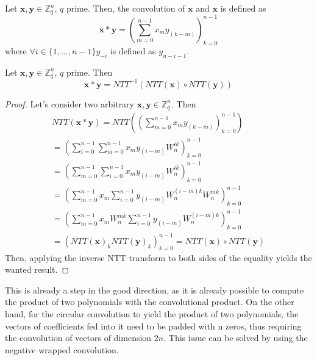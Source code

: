\begin{definition}
Let $\mathbf{x},\mathbf{y}\in\mathbb{Z}_q^n$, $q$ prime. Then, the convolution of $\mathbf{x}$ and $\mathbf{x}$ is defined as
\begin{equation*}
\mathbf{x}\ast\mathbf{y} = \left(\sum_{m=0}^{n-1}x_{m}y_{(k-m)}\right)_{k=0}^{n-1}
\end{equation*}
where $\forall i \in \{1,\ldots,n-1\} y_{-i}$ is defined as $y_{n-i-1}$. 
\end{definition}

\begin{theorem}
Let $\mathbf{x},\mathbf{y}\in\mathbb{Z}_q^n$, $q$ prime. Then
\begin{equation*}
\mathbf{x}\ast\mathbf{y} = NTT^{-1}(NTT(\mathbf{x}) \circ NTT(\mathbf{y}))
\end{equation*}
\end{theorem}
\begin{proof}
Let's consider two arbitrary $\mathbf{x},\mathbf{y}\in\mathbb{Z}_q^n$. Then
\begin{equation*}
\begin{aligned}
NTT(\mathbf{x}\ast\mathbf{y}) = NTT\left(\left(\sum_{m=0}^{n-1}x_{m}y_{(k-m)}\right)_{k=0}^{n-1}\right)\\
= \left(\sum_{i=0}^{n-1}\sum_{m=0}^{n-1}x_my_{(i-m)}W_n^{ik}\right)_{k=0}^{n-1}\\
= \left(\sum_{m=0}^{n-1}\sum_{i=0}^{n-1}x_my_{(i-m)}W_n^{ik}\right)_{k=0}^{n-1}\\
= \left(\sum_{m=0}^{n-1}x_m\sum_{i=0}^{n-1}y_{(i-m)}W_n^{(i-m)k}W_n^{mk}\right)_{k=0}^{n-1}\\
= \left(\sum_{m=0}^{n-1}x_mW_n^{mk}\sum_{i=0}^{n-1}y_{(i-m)}W_n^{(i-m)k}\right)_{k=0}^{n-1}\\
= \left(NTT(\mathbf{x})_kNTT(\mathbf{y})_k\right)_{k=0}^{n-1} = NTT(\mathbf{x})\circ NTT(\mathbf{y})
\end{aligned}
\end{equation*}
Then, applying the inverse NTT transform to both sides of the equality yields the wanted result.
\end{proof}

This is already a step in the good direction, as it is already possible to compute the product of two polynomials with the convolutional product. On the other hand, for the circular convolution to yield the product of two polynomials, the vectors of coefficients fed into it need to be padded with n zeros, thus requiring the convolution of vectors of dimension $2n$. This issue can be solved by using the negative wrapped convolution.

